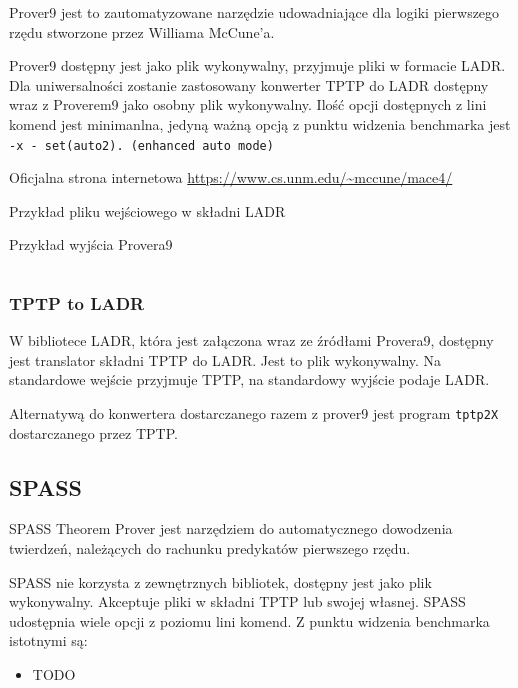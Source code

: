 \documentclass[a4paper,12pt]{article}
\newenvironment{longlisting}{\captionsetup{type=listing}}{}
\begin{document}
Prover9 jest to zautomatyzowane narzędzie udowadniające dla logiki pierwszego rzędu stworzone przez Williama McCune’a.

Prover9 dostępny jest jako plik wykonywalny, przyjmuje pliki w formacie \gls{LADR}. Dla uniwersalności zostanie zastosowany konwerter TPTP do LADR dostępny wraz z Proverem9 jako osobny plik wykonywalny. Ilość opcji dostępnych z lini komend jest minimanlna, jedyną ważną opcją z punktu widzenia benchmarka jest \texttt{-x - set(auto2).  (enhanced auto mode)}

\noindent
Oficjalna strona internetowa \url{https://www.cs.unm.edu/~mccune/mace4/}

\begin{longlisting}
  \caption{Przykład pliku wejściowego w składni LADR}
\end{longlisting}

\begin{longlisting}
  \caption{Przykład wyjścia Provera9}
  \inputminted{text}{listings/prover9_example.out}
\end{longlisting}

\subsubsection{TPTP to LADR}

W bibliotece \gls{LADR}, która jest załączona wraz ze źródłami Provera9, dostępny jest translator składni TPTP do LADR. Jest to plik wykonywalny. Na standardowe wejście przyjmuje TPTP, na standardowy wyjście podaje LADR.

Alternatywą do konwertera dostarczanego razem z prover9 jest program \texttt{tptp2X} dostarczanego przez TPTP.

\subsection{SPASS}

SPASS Theorem Prover jest narzędziem do automatycznego dowodzenia twierdzeń, należących do rachunku predykatów pierwszego rzędu.

SPASS nie korzysta z zewnętrznych bibliotek, dostępny jest jako plik wykonywalny. Akceptuje pliki w składni TPTP lub swojej własnej. SPASS udostępnia wiele opcji z poziomu lini komend. Z punktu widzenia benchmarka istotnymi są:

\begin{itemize}
  \item TODO
\end{itemize}
\end{document}
